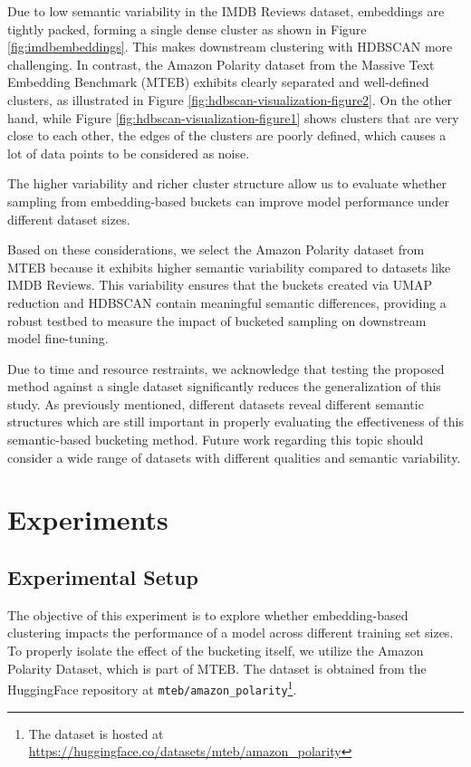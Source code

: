 \documentclass[twocolumn]{article}
\newcounter{ex}
\renewcommand{\indent}{\hspace*{2em}}
\begin{document}
\indent Due to low semantic variability in the IMDB Reviews dataset, embeddings are tightly packed, forming a single dense cluster as shown in Figure \ref{fig:imdbembeddings}. This makes downstream clustering with HDBSCAN more challenging. In contrast, the Amazon Polarity dataset from the Massive Text Embedding Benchmark (MTEB) \cite{muennighoff2022mteb} exhibits clearly separated and well-defined clusters, as illustrated in Figure \ref{fig:hdbscan-visualization-figure2}. On the other hand, while Figure \ref{fig:hdbscan-visualization-figure1} shows clusters that are very close to each other, the edges of the clusters are poorly defined, which causes a lot of data points to be considered as noise. 

\indent The higher variability and richer cluster structure allow us to evaluate whether sampling from embedding-based buckets can improve model performance under different dataset sizes.

\indent Based on these considerations, we select the Amazon Polarity dataset from MTEB because it exhibits higher semantic variability compared to datasets like IMDB Reviews. This variability ensures that the buckets created via UMAP reduction and HDBSCAN contain meaningful semantic differences, providing a robust testbed to measure the impact of bucketed sampling on downstream model fine-tuning.

\indent Due to time and resource restraints, we acknowledge that testing the proposed method against a single dataset significantly reduces the generalization of this study. As previously mentioned, different datasets reveal different semantic structures which are still important in properly evaluating the effectiveness of this semantic-based bucketing method. Future work regarding this topic should consider a wide range of datasets with different qualities and semantic variability.

\section{Experiments}\label{experiments}

\subsection{Experimental Setup}\label{experiments:setup}
\indent The objective of this experiment is to explore whether embedding-based clustering impacts the performance of a model across different training set sizes. To properly isolate the effect of the bucketing itself, we utilize the Amazon Polarity Dataset, which is part of MTEB. The dataset is obtained from the HuggingFace repository at \texttt{mteb/amazon\_polarity}\footnote{The dataset is hosted at \url{https://huggingface.co/datasets/mteb/amazon_polarity}}.
\end{document}

